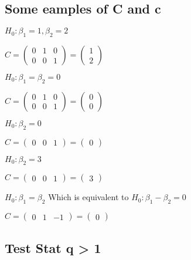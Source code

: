 \documentclass[
  letterpaper,
  DIV=11,
  numbers=noendperiod]{scrreprt}
\begin{document}
\hypertarget{some-eamples-of-c-and-c}{%
\subsection{Some eamples of C and c}\label{some-eamples-of-c-and-c}}

\(H_0 : \beta_1 = 1, \beta_2=2\)

\(C = \begin{pmatrix} 0 & 1 & 0\\ 0 & 0 & 1 \end{pmatrix} = \begin{pmatrix} 1 \\ 2 \end{pmatrix}\)

\hfill\break

\(H_0 : \beta_1 = \beta_2 = 0\)

\(C = \begin{pmatrix} 0 & 1 & 0\\ 0 & 0 & 1 \end{pmatrix} = \begin{pmatrix} 0 \\ 0 \end{pmatrix}\)

\hfill\break

\(H_0 : \beta_2 = 0\)

\(C = \begin{pmatrix} 0 & 0 & 1 \end{pmatrix} = \begin{pmatrix} 0 \end{pmatrix}\)

\hfill\break

\(H_0 : \beta_2 = 3\)

\(C = \begin{pmatrix} 0 & 0 & 1 \end{pmatrix} = \begin{pmatrix} 3 \end{pmatrix}\)

\hfill\break

\(H_0 : \beta_1 = \beta_2\) Which is equivalent to
\(H_0 : \beta_1 - \beta_2 = 0\)

\(C = \begin{pmatrix} 0 & 1 & -1 \end{pmatrix} = \begin{pmatrix} 0 \end{pmatrix}\)

\hypertarget{test-stat-q-1}{%
\subsection{Test Stat q \textgreater{} 1}\label{test-stat-q-1}}
\end{document}
